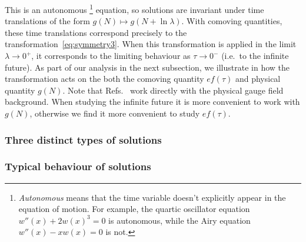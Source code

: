 \begin{itemize}
This is an autonomous \footnote{\emph{Autonomous} means that the time variable doesn't explicitly appear in the equation of motion. For example, the quartic oscillator equation $w''(x)+2w(x)^{3}=0$ is autonomous, while the Airy equation $w''(x)-xw(x)=0$ is not. } equation, so solutions are invariant under time translations of the form $g(N)\mapsto g(N+\ln\lambda)$. With comoving quantities, these time translations correspond precisely to the transformation~\eqref{eq:symmetry3}. When this transformation is applied in the limit $\lambda\to0^{+}$, it corresponds to the limiting behaviour as $\tau\to0^{-}$ (i.e.\ to the infinite future). As part of our analysis in the next subsection, we illustrate in  how the transformation acts on the both the comoving quantity $ef(\tau)$ and physical quantity $g(N)$. Note that Refs.~\cite{Adshead:2012kp,Dimastrogiovanni:2012ew,Adshead:2013qp,Adshead:2013nka} work directly with the physical gauge field background. When studying the infinite future it is more convenient to work with $g(N)$, otherwise we find it more convenient to study $ef(\tau)$. 
\end{itemize}

\subsubsection{Three distinct types of solutions\label{subsec:solutions}}

\subsubsection*{Typical behaviour of solutions }

